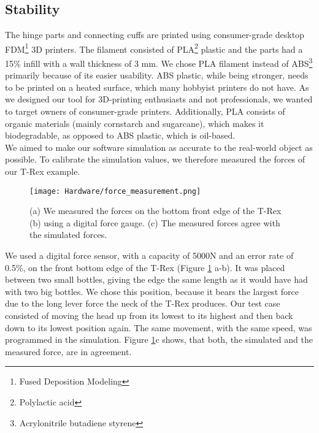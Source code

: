 \subsection{Stability}
The hinge parts and connecting cuffs are printed using consumer-grade desktop FDM\footnote{Fused Deposition Modeling} 3D printers. The filament consisted of PLA\footnote{Polylactic acid} plastic and the parts had a 15\% infill with a wall thickness of 3 mm. We chose PLA filament instead of ABS\footnote{Acrylonitrile butadiene styrene} primarily because of its easier usability. ABS plastic, while being stronger, needs to be printed on a heated surface, which many hobbyist printers do not have. As we designed our tool for 3D-printing enthusiasts and not professionals, we wanted to target owners of consumer-grade printers. Additionally, PLA consists of organic materials (mainly cornstarch and sugarcane), which makes it biodegradable, as opposed to ABS plastic, which is oil-based.\\
We aimed to make our software simulation as accurate to the real-world object as possible. To calibrate the simulation values, we therefore measured the forces of our T-Rex example.\\
\begin{figure}[h!]
    \texttt{[image: Hardware/force\_measurement.png]}
    \centering
    \caption{(a) We measured the forces on the bottom front edge of the T-Rex (b) using a digital force gauge. (c) The measured forces agree with the simulated forces.}
    \label{fig:force_measurement}
\end{figure}
We used a digital force sensor, with a capacity of 5000N and an error rate of 0.5\%, on the front bottom edge of the T-Rex (Figure \ref{fig:force_measurement} a-b). It was placed between two small bottles, giving the edge the same length as it would have had with two big bottles. We chose this position, because it bears the largest force due to the long lever force the neck of the T-Rex produces. Our test case consisted of moving the head up from its lowest to its highest and then back down to its lowest position again. The same movement, with the same speed, was programmed in the simulation. Figure \ref{fig:force_measurement}c shows, that both, the simulated and the measured force, are in agreement.

